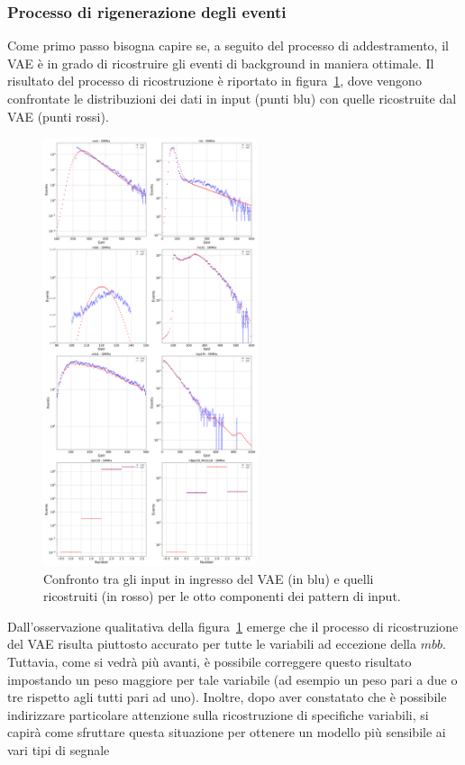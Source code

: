 \subsubsection{Processo di rigenerazione degli eventi}
\label{rigenerazione_eventi}
Come primo passo bisogna capire se, a seguito del processo di addestramento, il VAE è in grado di ricostruire gli eventi di background in maniera ottimale. Il risultato del processo di ricostruzione è riportato in figura~\ref{ricostruzione}, dove vengono confrontate le distribuzioni dei dati in input (punti blu) con quelle ricostruite dal VAE (punti rossi). 
\begin{figure}[h!]
	\centering
	\includegraphics[width=0.56\textwidth]{figs/risultati_simulazione/ricostruzione.png}
	\caption{Confronto tra gli input in ingresso del VAE (in blu) e quelli ricostruiti (in rosso) per le otto componenti dei pattern di input.}
	\label{ricostruzione}
\end{figure}

Dall'osservazione qualitativa della figura~\ref{ricostruzione} emerge che il processo di ricostruzione del VAE risulta piuttosto accurato per tutte le variabili ad eccezione della $\textit{mbb}$. \\
Tuttavia, come si vedrà più avanti, è possibile correggere questo risultato impostando un peso maggiore per tale variabile (ad esempio un peso pari a due o tre rispetto agli tutti pari ad uno). Inoltre, dopo aver constatato che è possibile indirizzare particolare attenzione sulla ricostruzione di specifiche variabili, si capirà come sfruttare questa situazione per ottenere un modello più sensibile ai vari tipi di segnale\\


